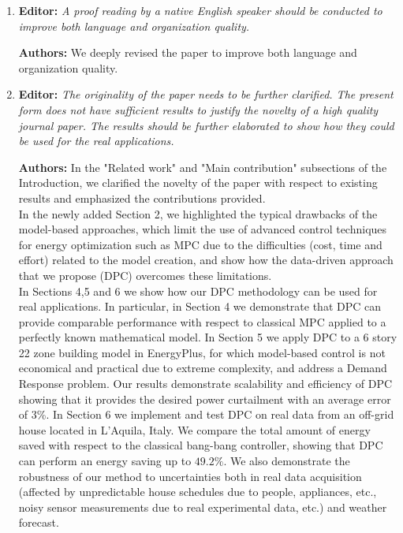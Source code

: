 \documentclass{article}
\begin{document}
\begin{enumerate}
	\item \textbf{Editor:} \textit{A proof reading by a native English speaker should be conducted to improve both language and organization quality.}



	\textbf{Authors:} We deeply revised the paper to improve both language and organization quality.



	\item \textbf{Editor:} \textit{The originality of the paper needs to be further clarified. The present form does not have sufficient results to justify the novelty of a high quality journal paper. The results should be further elaborated to show how they could be used for the real applications.}



	\textbf{Authors:} In the "Related work" and "Main contribution" subsections of the Introduction, we clarified the novelty of the paper with respect to existing results and emphasized the contributions provided.\\
		In the newly added Section 2, we highlighted the typical drawbacks of the model-based approaches, which limit the use of advanced control techniques for energy optimization such as MPC due to the difficulties (cost, time and effort) related to the model creation, and show how the data-driven approach that we propose (DPC) overcomes these limitations.\\
		In Sections 4,5 and 6 we show how our DPC methodology can be used for real applications. In particular, in Section 4 we demonstrate that DPC can provide comparable performance with respect to classical MPC applied to a perfectly known mathematical model. In Section 5 we apply DPC to a 6 story 22 zone building model in EnergyPlus, for which model-based control is not economical and practical due to extreme complexity, and address a Demand Response problem. Our results demonstrate scalability and efficiency of DPC showing that it provides the desired power curtailment with an average error of 3\%. In Section 6 we implement and test DPC on real data from an off-grid house located in L'Aquila, Italy. We compare the total amount of energy saved with respect to the classical bang-bang controller, showing that DPC can perform an energy saving up to $49.2\%$. We also demonstrate the robustness of our method to uncertainties both in real data acquisition (affected by unpredictable house schedules due to people, appliances, etc., noisy sensor measurements due to real experimental data, etc.) and weather forecast.
\end{enumerate}
\end{document}
